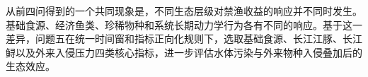 从前四问得到的一个共同现象是，不同生态层级对禁渔收益的响应并不同时发生。基础食源、经济鱼类、珍稀物种和系统长期动力学行为各有不同的响应。基于这一差异，问题五在统一时间窗和指标正向化规则下，选取基础食源、长江江豚、长江鲟以及外来入侵压力四类核心指标，进一步评估水体污染与外来物种入侵叠加后的生态效应。